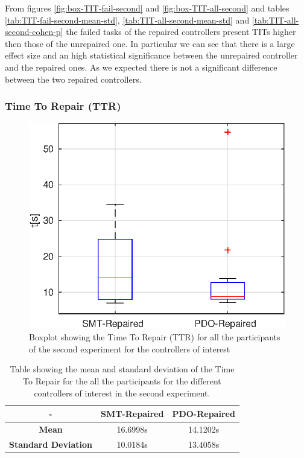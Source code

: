 From figures \ref{fig:box-TIT-fail-second} and \ref{fig:box-TIT-all-second} and tables \ref{tab:TIT-fail-second-mean-std}, \ref{tab:TIT-all-second-mean-std} and \ref{tab:TIT-all-second-cohen-p} the failed tasks of the repaired controllers present TITs higher then those of the unrepaired one. In particular we can see that there is a large effect size and an high statistical significance between the unrepaired controller and the repaired ones. As we expected there is not a significant difference between the two repaired controllers.
%
%
%
%
%
\subsubsection{Time To Repair (TTR)}\label{subsub:second-TTR}
\begin{figure}[H]
    \centering
    \includegraphics[width=\textwidth]{Images/second-experiment/exp1_time_to_repair.eps}
    \caption{Boxplot showing the Time To Repair (TTR) for all the participants of the second experiment for the controllers of interest}
    \label{fig:box-TTR-second}
\end{figure}
\begin{table}[H]
    \centering
    \begin{tabular}{|c|c|c|}
        \hline
        - & \textbf{SMT-Repaired} & \textbf{PDO-Repaired} \\
        \hline
        \textbf{Mean} & 16.6998s & 14.1202s \\
        \textbf{Standard Deviation} & 10.0184s & 13.4058s \\
        \hline
    \end{tabular}
    \caption{Table showing the mean and standard deviation of the Time To Repair for the all the participants for the different controllers of interest in the second experiment.}
    \label{tab:TTR-second-mean-std}
\end{table}
